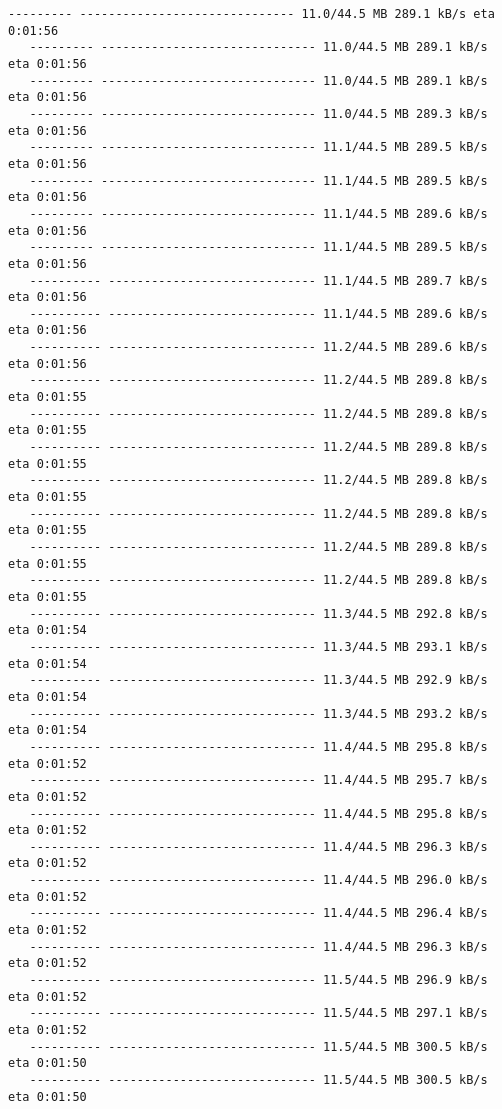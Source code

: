 \documentclass[11pt]{article}
\begin{document}
\begin{Verbatim}[commandchars=\\\{\}]
   --------- ------------------------------ 11.0/44.5 MB 289.1 kB/s eta 0:01:56
   --------- ------------------------------ 11.0/44.5 MB 289.1 kB/s eta 0:01:56
   --------- ------------------------------ 11.0/44.5 MB 289.1 kB/s eta 0:01:56
   --------- ------------------------------ 11.0/44.5 MB 289.3 kB/s eta 0:01:56
   --------- ------------------------------ 11.1/44.5 MB 289.5 kB/s eta 0:01:56
   --------- ------------------------------ 11.1/44.5 MB 289.5 kB/s eta 0:01:56
   --------- ------------------------------ 11.1/44.5 MB 289.6 kB/s eta 0:01:56
   --------- ------------------------------ 11.1/44.5 MB 289.5 kB/s eta 0:01:56
   ---------- ----------------------------- 11.1/44.5 MB 289.7 kB/s eta 0:01:56
   ---------- ----------------------------- 11.1/44.5 MB 289.6 kB/s eta 0:01:56
   ---------- ----------------------------- 11.2/44.5 MB 289.6 kB/s eta 0:01:56
   ---------- ----------------------------- 11.2/44.5 MB 289.8 kB/s eta 0:01:55
   ---------- ----------------------------- 11.2/44.5 MB 289.8 kB/s eta 0:01:55
   ---------- ----------------------------- 11.2/44.5 MB 289.8 kB/s eta 0:01:55
   ---------- ----------------------------- 11.2/44.5 MB 289.8 kB/s eta 0:01:55
   ---------- ----------------------------- 11.2/44.5 MB 289.8 kB/s eta 0:01:55
   ---------- ----------------------------- 11.2/44.5 MB 289.8 kB/s eta 0:01:55
   ---------- ----------------------------- 11.2/44.5 MB 289.8 kB/s eta 0:01:55
   ---------- ----------------------------- 11.3/44.5 MB 292.8 kB/s eta 0:01:54
   ---------- ----------------------------- 11.3/44.5 MB 293.1 kB/s eta 0:01:54
   ---------- ----------------------------- 11.3/44.5 MB 292.9 kB/s eta 0:01:54
   ---------- ----------------------------- 11.3/44.5 MB 293.2 kB/s eta 0:01:54
   ---------- ----------------------------- 11.4/44.5 MB 295.8 kB/s eta 0:01:52
   ---------- ----------------------------- 11.4/44.5 MB 295.7 kB/s eta 0:01:52
   ---------- ----------------------------- 11.4/44.5 MB 295.8 kB/s eta 0:01:52
   ---------- ----------------------------- 11.4/44.5 MB 296.3 kB/s eta 0:01:52
   ---------- ----------------------------- 11.4/44.5 MB 296.0 kB/s eta 0:01:52
   ---------- ----------------------------- 11.4/44.5 MB 296.4 kB/s eta 0:01:52
   ---------- ----------------------------- 11.4/44.5 MB 296.3 kB/s eta 0:01:52
   ---------- ----------------------------- 11.5/44.5 MB 296.9 kB/s eta 0:01:52
   ---------- ----------------------------- 11.5/44.5 MB 297.1 kB/s eta 0:01:52
   ---------- ----------------------------- 11.5/44.5 MB 300.5 kB/s eta 0:01:50
   ---------- ----------------------------- 11.5/44.5 MB 300.5 kB/s eta 0:01:50

\end{Verbatim}
\end{document}
